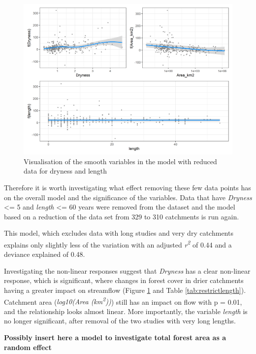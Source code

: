 \documentclass[]{elsarticle} %
\begin{document}
\begin{figure}
\includegraphics[width=0.9\linewidth]{model_redLength_smooths} \caption{Visualisation of the smooth variables in the model with reduced data for dryness and length}\label{fig:smoothsmodelredLength}
\end{figure}

Therefore it is worth investigating what effect removing these few data points has on the overall model and the significance of the variables. Data that have \emph{Dryness} \textless= 5 and \emph{length} \textless= 60 years were removed from the dataset and the model based on a reduction of the data set from 329 to 310 catchments is run again.

This model, which excludes data with long studies and very dry catchments explains only slightly less of the variation with an adjusted \emph{r\textsuperscript{2}} of 0.44 and a deviance explained of 0.48.

Investigating the non-linear responses suggest that \emph{Dryness} has a clear non-linear response, which is significant, where changes in forest cover in drier catchments having a greater impact on streamflow (Figure \ref{fig:smoothsmodelredLength} and Table \ref{tab:restrictlength}). Catchment area (\emph{log10(Area (km\textsuperscript{2}))}) still has an impact on flow with p = 0.01, and the relationship looks almost linear. More importantly, the variable \emph{length} is no longer significant, after removal of the two studies with very long lengths.

\textbf{Possibly insert here a model to investigate total forest area as a random effect}
\end{document}
